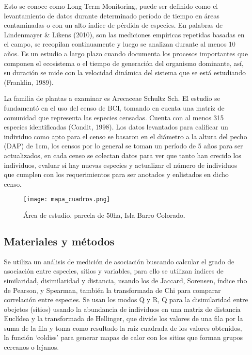 \documentclass[11pt,]{article}
\begin{document}
Esto se conoce como Long-Term Monitoring, puede ser definido como el
levantamiento de datos durante determinado período de tiempo en áreas
contaminadas o con un alto índice de pérdida de especies. En palabras de
Lindenmayer \& Likens (2010), son las mediciones empíricas repetidas
basadas en el campo, se recopilan continuamente y luego se analizan
durante al menos 10 años. Es un estudio a largo plazo cuando documenta
los procesos importantes que componen el ecosistema o el tiempo de
generación del organismo dominante, así, su duración se mide con la
velocidad dinámica del sistema que se está estudiando (Franklin, 1989).

La familia de plantas a examinar es Arecaceae Schultz Sch. El estudio se
fundamentó en el uso del censo de BCI, tomando en cuenta una matriz de
comunidad que representa las especies censadas. Cuenta con al menos 315
especies identificadas (Condit, 1998). Los datos levantados para
calificar un individuo como apto para el censo se basaron en el diámetro
a la altura del pecho (DAP) de 1cm, los censos por lo general se toman
un período de 5 años para ser actualizados, en cada censo se colectan
datos para ver que tanto han crecido los individuos, evaluar si hay
nuevas especies y actualizar el número de individuos que cumplen con los
requerimientos para ser anotados y enlistados en dicho censo.

\begin{figure}
\centering
\texttt{[image: mapa\_cuadros.png]}
\caption{Área de estudio, parcela de 50ha, Isla Barro Colorado.
\label{fig:mapa_cuadros}}
\end{figure}

\subsection{Materiales y métodos}\label{materiales-y-muxe9todos}

Se utiliza un análisis de medición de asociación buscando calcular el
grado de asociación entre especies, sitios y variables, para ello se
utilizan índices de similaridad, disimilaridad y distancia, usando los
de Jaccard, Sorensen, índice rho de Pearson, y Spearman, también la
transformada de Chi para comparar correlación entre especies. Se usan
los modos Q y R, Q para la disimilaridad entre obejetos (sitios) usando
la abundancia de individuos en una matriz de distancia Euclídea y la
transformada de Hellinger, que divide los valores de una fila por la
suma de la fila y toma como resultado la raíz cuadrada de los valores
obtenidos, la función `coldiss' para generar mapas de calor con los
sitios que forman grupos cercanos o lejanos.
\end{document}
